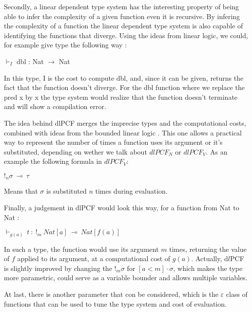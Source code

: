 \documentclass[a4paper,12pt]{article}
\begin{document}
\medskip

Secondly, a linear dependent type system has the interesting property of
being able to infer the complexity of a given function even it is
recursive. By infering the complexity of a function the linear
dependent type system is also capable of identifying the functions that
diverge. Using the ideas from linear logic, we could, for
example give type the following way :

\begin{center}
$\vdash_{I}$ dbl : Nat $\rightarrow$ Nat
\end{center}

In this type, I is the cost to compute dbl, and, since it can be given, returns
the fact that the function doesn't diverge. For the dbl function where
we replace the pred x by x the type system would realize that the function
doesn't terminate and will show a compilation error.

The idea behind dlPCF merges the imprecise types and the computational
costs, combined with ideas from the bounded linear logic
\cite{boundedlinearlogic}. This one allows a practical way to
represent the number of times a function uses its argument or it's
substituted, depending on wether we talk about $ dlPCF_{N} $ or $
dlPCF_{V} $. As an example the following formula in $ dlPCF_{V} $:

\begin{center}
$!_{n}\sigma~\multimap~\tau$
\end{center} 

Means that $\sigma$ is substituted $n$ times during evaluation. 

\medskip

Finally, a judgement in dlPCF would look this way, for a function from Nat to
Nat :

\begin{center}
$\vdash_{g(a)}~t~:~!_{m}~Nat[a]~\multimap~Nat[f(a)]$ 
\end{center}

In such a type, the function would use its argument $m$ times, returning 
the value of $f$ applied to its argument, at a computational cost of
$g(a)$. Actually, d$l$PCF is slightly improved by changing the $!_{m}\sigma$ for
$[a < m] \cdot \sigma$, which makes the type more parametric, could serve as a
variable bounder and allows multiple variables.

At last, there is another parameter that con be considered, which is the $\varepsilon$
class of functions that can be used to tune the type system and cost of
evaluation.
\end{document}
